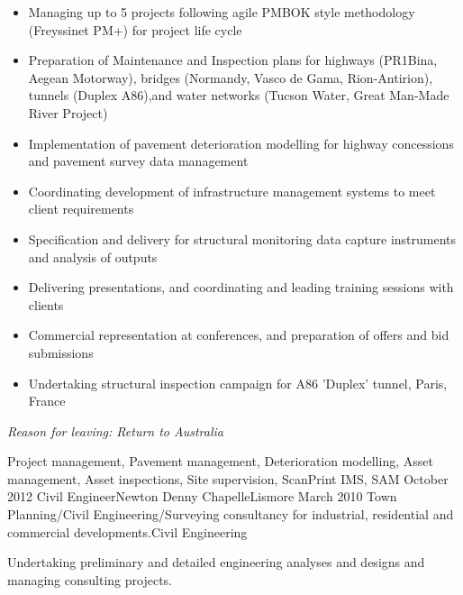 \begin{experiences}
{                      \begin{itemize}
                     \item Managing up to 5 projects following agile PMBOK style methodology (Freyssinet PM+) for project life cycle
		\item Preparation of Maintenance and Inspection plans for highways (PR1Bina, Aegean Motorway), bridges (Normandy, Vasco de Gama, Rion-Antirion), tunnels (Duplex A86),and water networks (Tucson Water, Great Man-Made River Project) 
		\item Implementation of pavement deterioration modelling for highway concessions and pavement survey data management
		\item Coordinating development of infrastructure management systems to meet client requirements
   		\item Specification and delivery for structural monitoring data capture instruments and analysis of outputs
		\item Delivering presentations, and coordinating and leading training sessions with clients
		\item Commercial representation at conferences, and preparation of offers and bid submissions
		\item Undertaking structural inspection campaign for A86 'Duplex' tunnel, Paris, France
                      \end{itemize}
                    \textit{Reason for leaving: Return to Australia}
                    }
                    {Project management, Pavement management, Deterioration modelling, Asset management, Asset inspections, Site supervision, ScanPrint IMS, SAM}
  \emptySeparator
  \consultantexperience
  {October 2012}       {Civil Engineer}{Newton Denny Chapelle}{Lismore}
  {March 2010}      {Town Planning/Civil Engineering/Surveying consultancy for industrial, residential and commercial developments.}{Civil Engineering}
                    {Undertaking preliminary and detailed engineering analyses and designs and managing consulting projects.
           \begin{itemize}


\end{itemize}}
\end{experiences}

